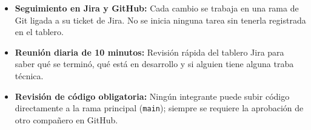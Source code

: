 \begin{itemize}[nosep]
    \item \textbf{Seguimiento en Jira y GitHub:} Cada cambio se trabaja en una rama de Git ligada a su ticket de Jira. No se inicia ninguna tarea sin tenerla registrada en el tablero.
    \item \textbf{Reunión diaria de 10 minutos:} Revisión rápida del tablero Jira para saber qué se terminó, qué está en desarrollo y si alguien tiene alguna traba técnica.
    \item \textbf{Revisión de código obligatoria:} Ningún integrante puede subir código directamente a la rama principal (\texttt{main}); siempre se requiere la aprobación de otro compañero en GitHub.
\end{itemize}
